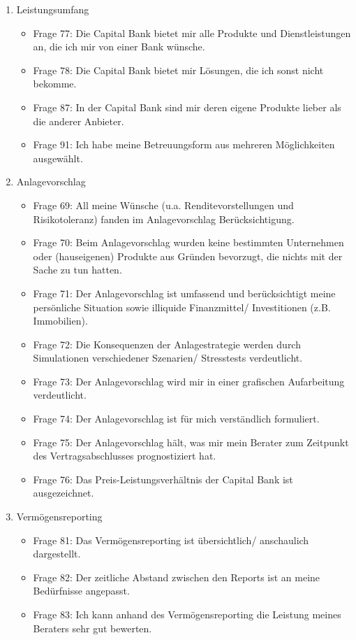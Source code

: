 \documentclass{article}\usepackage[]{graphicx}\usepackage[]{color}
\begin{document}
\begin{enumerate}
		
	\item Leistungsumfang
		\begin{itemize}
			\item Frage 77:
			Die Capital Bank bietet mir alle Produkte und Dienstleistungen an, die ich mir von einer Bank wünsche.
			\item Frage 78:
			Die Capital Bank bietet mir Lösungen, die ich sonst nicht bekomme.
			\item Frage 87:
			In der Capital Bank sind mir deren eigene Produkte lieber als die anderer Anbieter.
			\item Frage 91:
			Ich habe meine Betreuungsform aus mehreren Möglichkeiten ausgewählt.
		\end{itemize}
		
		
	\item Anlagevorschlag
		\begin{itemize}
			\item Frage 69:
			All meine Wünsche (u.a. Renditevorstellungen und Risikotoleranz) fanden im Anlagevorschlag Berücksichtigung.
			\item Frage 70:
			Beim Anlagevorschlag wurden keine bestimmten Unternehmen oder (hauseigenen) Produkte aus Gründen bevorzugt, die nichts mit der Sache zu tun hatten.
			\item Frage 71:
			Der Anlagevorschlag ist umfassend und berücksichtigt meine persönliche Situation sowie illiquide Finanzmittel/ Investitionen (z.B. Immobilien).
			\item Frage 72:
			Die Konsequenzen der Anlagestrategie werden durch Simulationen verschiedener Szenarien/ Stresstests verdeutlicht.
			\item Frage 73:
			Der Anlagevorschlag wird mir in einer grafischen Aufarbeitung verdeutlicht.
			\item Frage 74:
			Der Anlagevorschlag ist für mich verständlich formuliert.
			\item Frage 75:
			Der Anlagevorschlag hält, was mir mein Berater zum Zeitpunkt des Vertragsabschlusses prognostiziert hat.
			\item Frage 76:
			Das Preis-Leistungsverhältnis der Capital Bank ist ausgezeichnet.
		\end{itemize}
		
		
	\item Vermögensreporting
		\begin{itemize}
			\item Frage 81:
			Das Vermögensreporting ist übersichtlich/ anschaulich dargestellt.
			\item Frage 82:
			Der zeitliche Abstand zwischen den Reports ist an meine Bedürfnisse angepasst.
			\item Frage 83:
			Ich kann anhand des Vermögensreporting die Leistung meines Beraters sehr gut bewerten.
		\end{itemize}
		

\end{enumerate}
\end{document}
